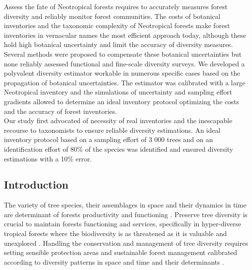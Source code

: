 \documentclass[
  11pt,
  french,
  A4paper,
  extrafontsizes,onecolumn,openright
  ]{memoir}
\begin{document}
Assess the fate of Neotropical forests requires to accurately measures
forest diversity and reliably monitor forest communities. The costs of
botanical inventories and the taxonomic complexity of Neotropical
forests make forest inventories in vernacular names the most efficient
approach today, although these hold high botanical uncertainty and limit
the accuracy of diversity measures. Several methods were proposed to
compensate these botanical uncertainties but none reliably assessed
functional and fine-scale diversity surveys. We developed a polyvalent
diversity estimator workable in numerous specific cases based on the
propagation of botanical uncertainties. The estimator was calibrated
with a large Neotropical inventory and the simulations of uncertainty
and sampling effort gradients allowed to determine an ideal inventory
protocol optimizing the costs and the accuracy of forest inventories.\\
Our study first advocated of necessity of real inventories and the
inescapable recourse to taxonomists to ensure reliable diversity
estimations. An ideal inventory protocol based on a sampling effort of 3
000 trees and on an identification effort of 80\% of the species was
identified and ensured diversity estimations with a 10\% error.

\subsection{Introduction}\label{introduction}

The variety of tree species, their assemblages in space and their
dynamics in time are determinant of forests productivity and functioning
\autocite{Cardinale2012}. Preserve tree diversity is crucial to maintain
forests functioning and services, specifically in hyper-diverse tropical
forests where the biodiversity is as threatened as it is valuable and
unexplored \autocite{Barlow2018}. Handling the conservation and
management of tree diversity requires setting sensible protection areas
and sustainable forest management calibrated according to diversity
patterns in space and time and their determinants
\autocites{Margules2000}{Purvis2000}{Gibson2011a}{FAO2014}{Sist2015}.
\end{document}
